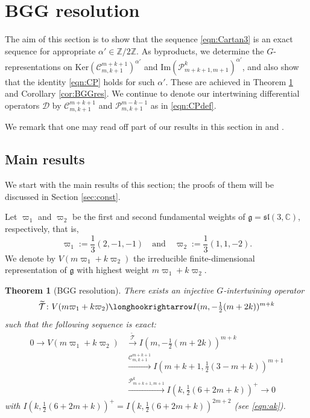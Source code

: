 \documentclass[reqno,11pt]{amsart}
\newtheorem{thm}[equation]{Theorem}
\theoremstyle{remark}
\numberwithin{equation}{section}
\newcommand{\ga}{\alpha}
\newcommand{\fg}{{\mathfrak g}}
\newcommand{\f}{\mathfrak}
\newcommand{\C}{\mathbb{C}}
\newcommand{\Z}{\mathbb{Z}}
\newcommand{\Cal}{\mathcal}
\renewcommand{\Im}{\mathrm{Im}}
\newcommand{\To}{\longrightarrow}
\newcommand{\D}{\Cal{D}}
\newcommand{\wT}{\widetilde{\Cal{T}}}
\newcommand{\Ker}{\mathrm{Ker}}
\begin{document}
\section{BGG resolution}\label{sec:BGG}


The aim of this section is to show that the sequence \eqref{eqn:Cartan3} 
is  an exact sequence for appropriate $\ga' \in \Z/2\Z$. As byproducts,
we determine the $G$-representations on
$\Ker(\Cal{C}^{m+k+1}_{m,k+1})^{\ga'}$ and 
$\Im(\Cal{P}^{k}_{m+k+1,m+1})^{\ga'}$,
and also show that the identity \eqref{eqn:CP} holds for such $\ga'$.
These are achieved in Theorem \ref{thm:BGGres} and Corollary \ref{cor:BGGres}.
We continue to denote our intertwining differential operators $\D$ by
$\Cal{C}^{m+k+1}_{m,k+1}$ and $\Cal{P}^{m-k-1}_{m,k+1}$ 
as in \eqref{eqn:CPdef}.

We remark that one may read off part of 
our results in this section in \cite[Prop.\ 2.1]{CGH12b} and \cite[Sect.\ 4]{EG11}.


\subsection{Main results}
\label{sec:main6}
We start with the main results of this section; the proofs of them will be 
discussed in Section \ref{sec:const}.

Let $\varpi_1$ and $\varpi_2$ be the first and second fundamental weights
of $\fg = \f{sl}(3,\C)$, respectively, that is,
\begin{equation*}
\varpi_1:=\frac{1}{3}(2,-1,-1)
\quad
\text{and}
\quad
\varpi_2:=\frac{1}{3}(1,1,-2).
\end{equation*}
We denote by $V(m\varpi_1 + k\varpi_2)$ the irreducible finite-dimensional 
representation of $\fg$ with highest weight $m\varpi_1 + k\varpi_2$.

\begin{thm}[BGG resolution]
\label{thm:BGGres}
There exists an injective $G$-intertwining operator 
\begin{equation*}
\wT\colon
V(m\varpi_1 + k \varpi_2)
\longhookrightarrow
I(m, -\tfrac{1}{2}(m+2k))^{m+k}
\end{equation*}
such that the following sequence 
is exact:
\begin{equation}\label{eqn:BGGres}
\begin{aligned}
0\To
V(m\varpi_1 + k \varpi_2)
&\stackrel{\wT}{\To}
I(m, -\tfrac{1}{2}(m+2k))^{m+k}\\
&\stackrel{\Cal{C}^{m+k+1}_{m,k+1}}{\To}
I(m+k+1, \tfrac{1}{2}(3-m+k))^{m+1}\\[5pt]
&\stackrel{\Cal{P}^{k}_{m+k+1,m+1}}{\To}
I(k, \tfrac{1}{2}(6+2m+k))^{+}
\To 0
\end{aligned}
\end{equation}
with $I(k, \tfrac{1}{2}(6+2m+k))^{+}=I(k, \tfrac{1}{2}(6+2m+k))^{2m+2}$
(see \eqref{eqn:ak}).
\end{thm}
\end{document}
